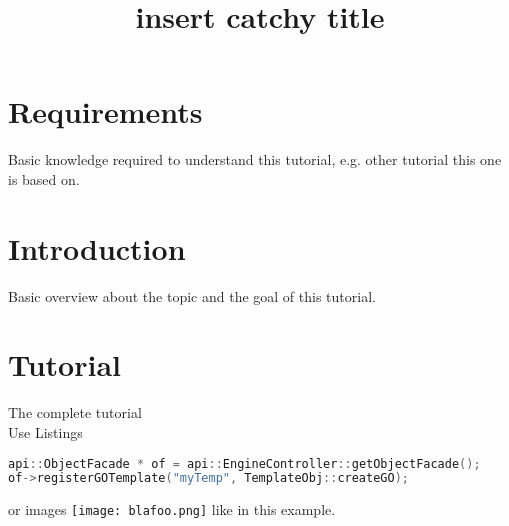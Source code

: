 \documentclass{article}
\title{insert catchy title}
\begin{document}
\section{Requirements}

Basic knowledge required to understand this tutorial, e.g. other tutorial this one is based on.

\section{Introduction}

Basic overview about the topic and the goal of this tutorial.

\section{Tutorial}

The complete tutorial\\

Use Listings \begin{lstlisting}[language=C++, style=basic, caption={register objects}, label=code:registerGO]
api::ObjectFacade * of = api::EngineController::getObjectFacade();
of->registerGOTemplate("myTemp", TemplateObj::createGO);
\end{lstlisting} or images \texttt{[image: blafoo.png]} like in this example.
\end{document}
